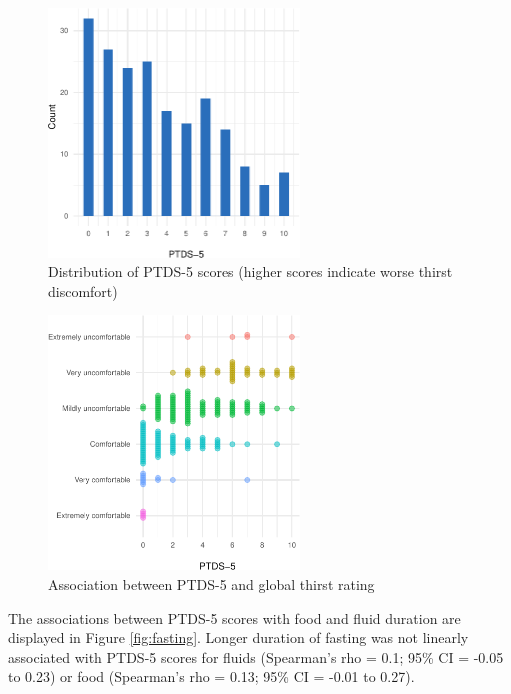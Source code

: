\documentclass[12pt,twocolumn,twoside,]{pinp}
\begin{document}
\begin{figure}

{\centering \includegraphics[width=252px]{manuscript_files/figure-latex/distributionpdf-1} 

}

\caption{Distribution of PTDS-5 scores (higher scores indicate worse thirst discomfort)}\label{fig:distributionpdf}
\end{figure}

\begin{figure}

{\centering \includegraphics[width=252px]{manuscript_files/figure-latex/globalthirst-1} 

}

\caption{Association between PTDS-5 and global thirst rating}\label{fig:globalthirst}
\end{figure}

The associations between PTDS-5 scores with food and fluid duration are
displayed in Figure \ref{fig:fasting}. Longer duration of fasting was
not linearly associated with PTDS-5 scores for fluids (Spearman's rho =
0.1; 95\% CI = -0.05 to 0.23) or food (Spearman's rho = 0.13; 95\% CI =
-0.01 to 0.27).
\end{document}
